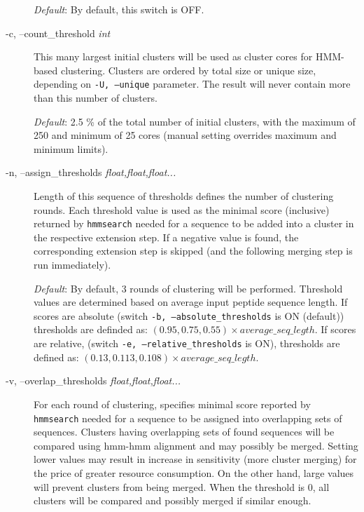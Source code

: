\documentclass[11pt, a4paper, twoside, titlepage]{article}
\begin{document}
\begin{description}
	  	  \textit{Default}: By default, this switch is OFF.
	  
	  \item[-c, --count\_threshold \rm \textlangle \textit{int}\textrangle] This many largest initial clusters will be used as cluster cores for HMM-based clustering. Clusters are ordered by total size or unique size, depending on \texttt{-U, --unique} parameter. The result will never contain more than this number of clusters.
	 
	  \textit{Default}: 2.5 \% of the total number of initial clusters, with the maximum of 250 and minimum of 25 cores (manual setting overrides maximum and minimum limits).
	  
	  	  \item[-n, --assign\_thresholds \rm \textlangle \textit{float,float,float...}\textrangle] Length of this sequence of thresholds defines the number of clustering rounds. Each threshold value is used as the minimal score (inclusive) returned by \texttt{hmmsearch} needed for a sequence to be added into a cluster in the respective extension step. If a negative value is found, the corresponding extension step is skipped (and the following merging step is run immediately).
	 
\begin{sloppypar}
	 
	  \textit{Default}: By default, 3 rounds of clustering will be performed. Threshold values are determined based on average input peptide sequence length. If scores are absolute (switch \texttt{-b, --absolute\_thresholds} is ON (default)) thresholds are definded as: $(0.95, 0.75, 0.55)\times average\_seq\_legth$. If scores are relative, (switch \texttt{-e, --relative\_thresholds} is ON),  thresholds are defined as: $(0.13, 0.113, 0.108)\times average\_seq\_legth$.

\end{sloppypar}	  
	    
	\item[-v, --overlap\_thresholds \rm \textlangle \textit{float,float,float...}\textrangle] For each round of clustering, specifies minimal score reported by \texttt{hmmsearch} needed for a sequence to be assigned into overlapping sets of sequences. Clusters having overlapping sets of found sequences will be compared using hmm-hmm alignment and may possibly be merged. Setting lower values may result in increase in sensitivity (more cluster merging) for the price of greater resource consumption. On the other hand, large values will prevent clusters from being merged. When the threshold is 0, all clusters will be compared and possibly merged if similar enough. 
	

\end{description}
\end{document}

